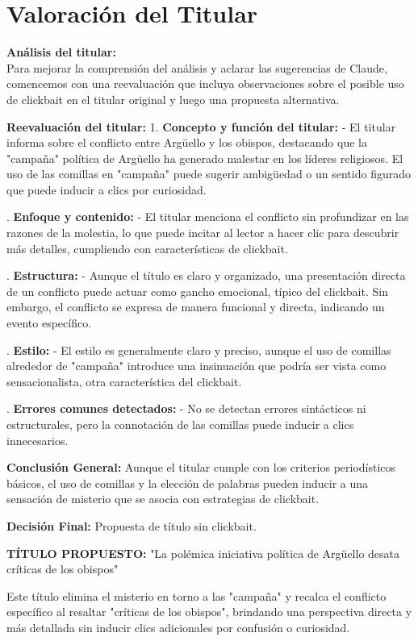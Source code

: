\documentclass[10pt,a4paper]{article}
\begin{document}
\section*{Valoración del Titular}
        \textbf{Análisis del titular:} \\ 
        Para mejorar la comprensi\'{o}n del an\'{a}lisis y aclarar las sugerencias de Claude, comencemos con una reevaluaci\'{o}n que incluya observaciones sobre el posible uso de clickbait en el titular original y luego una propuesta alternativa. 
\par\medskip
\textbf{Reevaluaci\'{o}n del titular:} 1. \textbf{Concepto y funci\'{o}n del titular:}    - El titular informa sobre el conflicto entre Arg\"{u}ello y los obispos, destacando que la "campa\~{n}a" pol\'{i}tica de Arg\"{u}ello ha generado malestar en los l\'{i}deres religiosos. El uso de las comillas en "campa\~{n}a" puede sugerir ambig\"{u}edad o un sentido figurado que puede inducir a clics por curiosidad.
\par{}. \textbf{Enfoque y contenido:}    - El titular menciona el conflicto sin profundizar en las razones de la molestia, lo que puede incitar al lector a hacer clic para descubrir m\'{a}s detalles, cumpliendo con caracter\'{i}sticas de clickbait.
\par{}. \textbf{Estructura:}    - Aunque el t\'{i}tulo es claro y organizado, una presentaci\'{o}n directa de un conflicto puede actuar como gancho emocional, t\'{i}pico del clickbait. Sin embargo, el conflicto se expresa de manera funcional y directa, indicando un evento espec\'{i}fico.
\par{}. \textbf{Estilo:}    - El estilo es generalmente claro y preciso, aunque el uso de comillas alrededor de "campa\~{n}a" introduce una insinuaci\'{o}n que podr\'{i}a ser vista como sensacionalista, otra caracter\'{i}stica del clickbait.
\par{}. \textbf{Errores comunes detectados:}    - No se detectan errores sint\'{a}cticos ni estructurales, pero la connotaci\'{o}n de las comillas puede inducir a clics innecesarios.
\par\medskip
\textbf{Conclusi\'{o}n General:} Aunque el titular cumple con los criterios period\'{i}sticos b\'{a}sicos, el uso de comillas y la elecci\'{o}n de palabras pueden inducir a una sensaci\'{o}n de misterio que se asocia con estrategias de clickbait.
\par\medskip
\textbf{Decisi\'{o}n Final:} Propuesta de t\'{i}tulo sin clickbait.
\par\medskip
\textbf{T\'{I}TULO PROPUESTO:} "La pol\'{e}mica iniciativa pol\'{i}tica de Arg\"{u}ello desata cr\'{i}ticas de los obispos"
\par\medskip
Este t\'{i}tulo elimina el misterio en torno a las "campa\~{n}a" y recalca el conflicto espec\'{i}fico al resaltar "cr\'{i}ticas de los obispos", brindando una perspectiva directa y m\'{a}s detallada sin inducir clics adicionales por confusi\'{o}n o curiosidad.
        \vspace{1em}
\vspace{1em}
\end{document}

